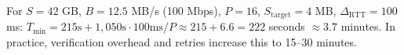For $S = 42$ GB, $B = 12.5$ MB/s (100 Mbps), $P = 16$, $S_{\text{target}} = 4$ MB, $\Delta_{\text{RTT}} = 100$ ms: $T_{\min} = 215\text{s} + 1{,}050\text{s} \cdot 100\text{ms}/P \approx 215 + 6.6 = 222$ seconds $\approx 3.7$ minutes. In practice, verification overhead and retries increase this to 15--30 minutes.

